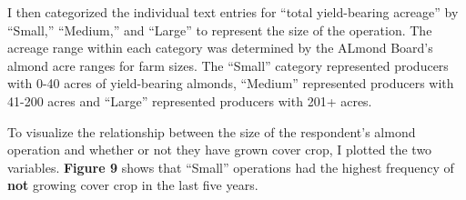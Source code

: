 \documentclass[12pt,]{article}
\begin{document}
I then categorized the individual text entries for ``total yield-bearing
acreage'' by ``Small,'' ``Medium,'' and ``Large'' to represent the size
of the operation. The acreage range within each category was determined
by the ALmond Board's almond acre ranges for farm sizes. The ``Small''
category represented producers with 0-40 acres of yield-bearing almonds,
``Medium'' represented producers with 41-200 acres and ``Large''
represented producers with 201+ acres.

To visualize the relationship between the size of the respondent's
almond operation and whether or not they have grown cover crop, I
plotted the two variables. \textbf{Figure 9} shows that ``Small''
operations had the highest frequency of \textbf{not} growing cover crop
in the last five years.

  \providecommand{\huxb}[2]{\arrayrulecolor[RGB]{#1}\global\arrayrulewidth=#2pt}
  \providecommand{\huxvb}[2]{\color[RGB]{#1}\vrule width #2pt}
  \providecommand{\huxtpad}[1]{\rule{0pt}{\baselineskip+#1}}
  \providecommand{\huxbpad}[1]{\rule[-#1]{0pt}{#1}}
\end{document}
